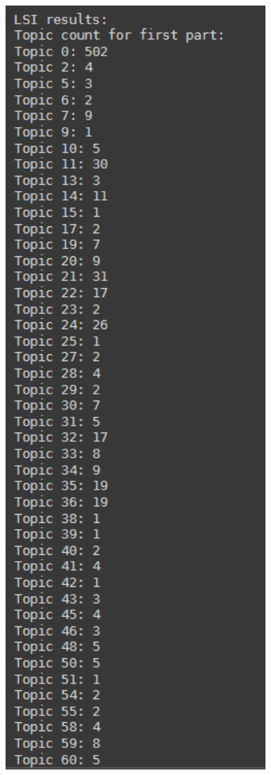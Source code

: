 \documentclass[a4paper]{article}
\begin{document}
\includegraphics[width=0.8\textwidth]{../images/LSI - 1.png}
\end{document}
